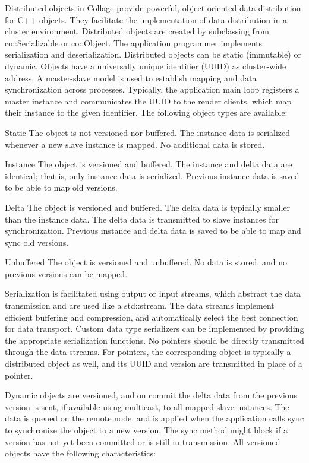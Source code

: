 Distributed objects in \textsf{Collage} provide powerful, object-oriented data
distribution for C++ objects. They facilitate the implementation of data
distribution in a cluster environment. Distributed objects are created by
subclassing from \textsf{co::Serializable} or \textsf{co::Object}. The
application programmer implements serialization and deserialization. Distributed
objects can be static (immutable) or dynamic. Objects have a universally unique
identifier (UUID) as cluster-wide address. A master-slave model is used to
establish mapping and data synchronization across processes. Typically, the
application main loop registers a master instance and communicates the UUID to
the render clients, which map their instance to the given identifier. The
following object types are available:

\begin{compactdesc}
\item[Static] The object is not versioned nor buffered. The instance data is
  serialized whenever a new slave instance is mapped. No additional data is
  stored.
\item[Instance] The object is versioned and buffered. The instance and delta
  data are identical; that is, only instance data is serialized. Previous
  instance data is saved to be able to map old versions.
\item[Delta] The object is versioned and buffered. The delta data is typically
  smaller than the instance data. The delta data is transmitted to slave
  instances for synchronization. Previous instance and delta data is saved to be
  able to map and sync old versions.
\item[Unbuffered] The object is versioned and unbuffered. No data is stored, and
  no previous versions can be mapped.
\end{compactdesc}

Serialization is facilitated using output or input streams, which abstract the
data transmission and are used like a \textsf{std::stream}. The data streams
implement efficient buffering and compression, and automatically select the best
connection for data transport. Custom data type serializers can be implemented
by providing the appropriate serialization functions. No pointers should be
directly transmitted through the data streams. For pointers, the corresponding
object is typically a distributed object as well, and its UUID and version are
transmitted in place of a pointer.

Dynamic objects are versioned, and on \textsf{commit} the delta data from the
previous version is sent, if available using multicast, to all mapped slave
instances. The data is queued on the remote node, and is applied when the
application calls \textsf{sync} to synchronize the object to a new version. The
\textsf{sync} method might block if a version has not yet been committed or is
still in transmission. All versioned objects have the following characteristics:

